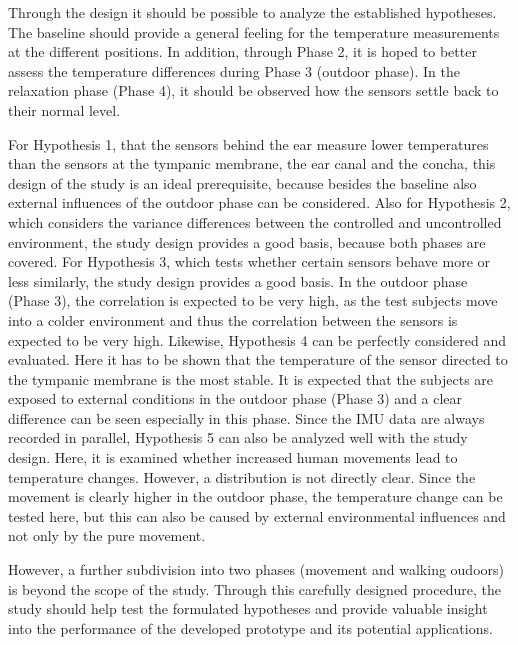 Through the design it should be possible to analyze the established hypotheses.
The baseline should provide a general feeling for the temperature measurements at the different positions.
In addition, through Phase 2, it is hoped to better assess the temperature differences during Phase 3 (outdoor phase).
In the relaxation phase (Phase 4), it should be observed how the sensors settle back to their normal level.

For Hypothesis 1, that the sensors behind the ear measure lower temperatures than the sensors at the tympanic membrane, the ear canal and the concha, this design of the study is an ideal prerequisite, because besides the baseline also external influences of the outdoor phase can be considered.
Also for Hypothesis 2, which considers the variance differences between the controlled and uncontrolled environment, the study design provides a good basis, because both phases are covered.
For Hypothesis 3, which tests whether certain sensors behave more or less similarly, the study design provides a good basis.
In the outdoor phase (Phase 3), the correlation is expected to be very high, as the test subjects move into a colder environment and thus the correlation between the sensors is expected to be very high.
Likewise, Hypothesis 4 can be perfectly considered and evaluated. 
Here it has to be shown that the temperature of the sensor directed to the tympanic membrane is the most stable. 
It is expected that the subjects are exposed to external conditions in the outdoor phase (Phase 3) and a clear difference can be seen especially in this phase.
Since the IMU data are always recorded in parallel, Hypothesis 5 can also be analyzed well with the study design.
Here, it is examined whether increased human movements lead to temperature changes. 
However, a distribution is not directly clear. 
Since the movement is clearly higher in the outdoor phase, the temperature change can be tested here, but this can also be caused by external environmental influences and not only by the pure movement.

However, a further subdivision into two phases (movement and walking oudoors) is beyond the scope of the study.
Through this carefully designed procedure, the study should help test the formulated hypotheses and provide valuable insight into the performance of the developed prototype and its potential applications.

